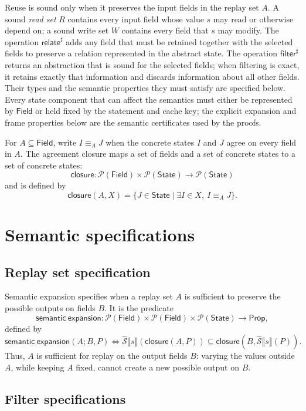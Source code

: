 \documentclass[10pt]{article}
\newcommand{\Field}{\mathsf{Field}}
\newcommand{\State}{\mathsf{State}}
\newcommand{\CollectingSemantics}[1]{\widehat{\mathcal S}\mathopen{⟦}#1\mathclose{⟧}}
\newcommand{\ProjClose}{\mathsf{closure}}
\newcommand{\filter}{\mathsf{filter}}
\newcommand{\relate}{\mathsf{relate}}
\newcommand{\SemanticExpand}{\mathsf{semantic\ expansion}}
\newcommand{\agree}[1]{\mathrel{\equiv_{#1}}}
\begin{document}
Reuse is sound only when it preserves the input fields in the replay set \(A\). A sound
\emph{read set} \(R\) contains every input field whose value \(s\) may read or otherwise
depend on; a sound write set \(W\) contains every field that \(s\) may modify.
The operation \(\relate^\sharp\) adds any field that must be retained together with the selected
fields to preserve a relation represented in the abstract state. The operation \(\filter^\sharp\)
returns an abstraction that is sound for the selected fields; when filtering is exact, it retains
exactly that information and discards information about all other fields. Their types and the
semantic properties they must satisfy are specified below. Every state component that can affect
the semantics must either be represented by \(\Field\) or held fixed by the statement and cache
key; the explicit expansion and frame properties below are the semantic certificates used by the
proofs.

For \(A\subseteq\Field\), write \(I\agree{A}J\) when the concrete states \(I\) and \(J\)
agree on every field in \(A\). The agreement closure maps a set of fields and a set of concrete
states to a set of concrete states:
\[
  \ProjClose:\mathcal P(\Field)\times\mathcal P(\State)
  \to\mathcal P(\State)
\]
and is defined by
\[
  \ProjClose(A,X)=\{J\in\State\mid \exists I\in X,\ I\agree{A}J\}.
\]

\section{Semantic specifications}

\subsection{Replay set specification}

Semantic expansion specifies when a replay set \(A\) is sufficient to preserve the possible
outputs on fields \(B\). It is the predicate
\[
  \SemanticExpand:
  \mathcal P(\Field)\times\mathcal P(\Field)\times\mathcal P(\State)
  \to\mathsf{Prop},
\]
defined by
\[
  \SemanticExpand(A;B,P)
  \Longleftrightarrow
  \CollectingSemantics{s}\!\left(\ProjClose(A,P)\right)
  \subseteq
  \ProjClose\!\left(B,\CollectingSemantics{s}(P)\right).
  \tag{SE}
\]
Thus, \(A\) is sufficient for replay on the output fields \(B\): varying the values outside
\(A\), while keeping \(A\) fixed, cannot create a new possible output on \(B\).

\subsection{Filter specifications}
\end{document}
